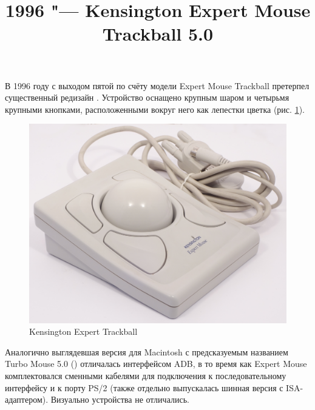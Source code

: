 \documentclass[11pt, a4paper]{article}
\begin{document}
\title{1996 "--- Kensington Expert Mouse Trackball 5.0}

\maketitle
В 1996 году с выходом пятой по счёту модели Expert Mouse Trackball претерпел существенный редизайн \cite{KensingtonPC}. Устройство оснащено крупным шаром и четырьмя крупными кнопками, расположенными вокруг него как лепестки цветка (рис. \ref{fig:pic}).

\begin{figure}[h]
    \centering
    \includegraphics[scale=0.4]{1996_kensington_expert_trackball_5/king.jpg}
    \caption{Kensington Expert Trackball}
    \label{fig:pic}
\end{figure}

Аналогично выглядевшая версия для Macintosh с предсказуемым названием Turbo Mouse 5.0 (\cite{KensingtonMac}) отличалась интерфейсом ADB, в то время как Expert Mouse комплектовался сменными кабелями для подключения к последовательному интерфейсу и к порту PS/2 (также отдельно выпускалась шинная версия с ISA-адаптером). Визуально устройства не отличались.
\end{document}

